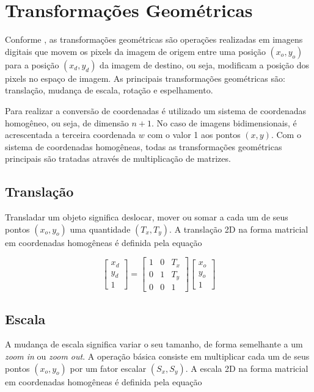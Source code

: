 \documentclass[12pt,oneside,a4paper,english,french,spanish,brazil,]{abntex2}
\begin{document}
\section{Transformações Geométricas}

Conforme \citet{conci:2003}, as transformações geométricas são operações realizadas em imagens digitais que movem os pixels da imagem de origem entre uma posição \((x_o,y_o)\) para a posição \((x_d,y_d)\) da imagem de destino, ou seja, modificam a posição dos pixels no espaço de imagem. As principais transformações geométricas são: translação, mudança de escala, rotação e espelhamento.

Para realizar a conversão de coordenadas é utilizado um sistema de coordenadas homogêneo, ou seja, de dimensão \(n+1\). No caso de imagens bidimensionais, é acrescentada a terceira coordenada \(w\) com o valor 1 aos pontos \((x, y)\). Com o sistema de coordenadas homogêneas, todas as transformações geométricas principais são tratadas através de multiplicação de matrizes.

\subsection{Translação}

Transladar um objeto significa deslocar, mover ou somar a cada um de seus pontos \((x_o,y_o)\) uma quantidade \((T_x,T_y)\). A translação 2D na forma matricial em coordenadas homogêneas é definida pela equação

\[
\begin{bmatrix}
x_d\\ 
y_d\\ 
1
\end{bmatrix}
=
\begin{bmatrix}
1 & 0 & T_x\\ 
0 & 1 & T_y\\ 
0 & 0 & 1
\end{bmatrix}
\begin{bmatrix}
x_o\\ 
y_o\\ 
1
\end{bmatrix}
\]

\subsection{Escala}

A mudança de escala significa variar o seu tamanho, de forma semelhante a um \textit{zoom in} ou \textit{zoom out}. A operação básica consiste em multiplicar cada um de seus pontos \((x_o,y_o)\) por um fator escalar \((S_x,S_y)\). A escala 2D na forma matricial em coordenadas homogêneas é definida pela equação
\end{document}
